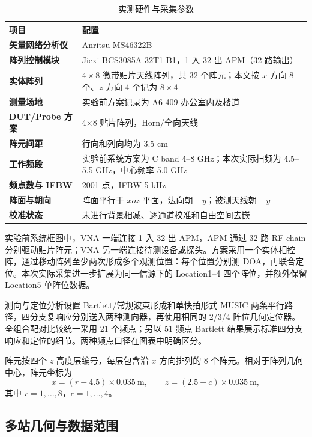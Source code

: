 \documentclass[UTF8,12pt,a4paper]{ctexart}
\begin{document}
\begin{table}[H]
  \centering
  \caption{实测硬件与采集参数}
  \label{tab:hardware}
  \begin{tabularx}{\textwidth}{>{\bfseries}p{}X}
    \toprule
    项目 & 配置 \\
    \midrule
    矢量网络分析仪 & Anritsu MS46322B \\
    阵列控制模块 & Jiexi BCS3085A-32T1-B1，1 入 32 出 APM（32 路输出） \\
    实体阵列 & $4\times8$ 微带贴片天线阵列，共 32 个阵元；本文按 $x$ 方向 8 个、$z$ 方向 4 个记为 $8\times4$ \\
    测量场地 & 实验前方案记录为 A6-409 办公室内及楼道 \\
    DUT/Probe 方案 & 4×8 贴片阵列，Horn/全向天线 \\
    阵元间距 & 行向和列向均为 3.5 cm \\
    工作频段 & 实验前系统方案为 C band 4--8 GHz；本次实际扫频为 4.5--5.5 GHz，中心频率 5.0 GHz \\
    频点数与 IFBW & 2001 点，IFBW 5 kHz \\
    阵面与朝向 & 阵面平行于 $xoz$ 平面，法向朝 $+y$；被测天线朝 $-y$ \\
    校准状态 & 未进行背景相减、逐通道校准和自由空间去嵌 \\
    \bottomrule
  \end{tabularx}
\end{table}

实验前系统框图中，VNA 一端连接 1 入 32 出 APM，APM 通过 32 路 RF chain 分别驱动贴片阵元；VNA 另一端连接待测设备或探头。方案采用一个实体相控阵，通过移动阵列至少两次形成多个观测位置：每个位置分别测 DOA，再联合定位。本次实际采集进一步扩展为同一信源下的 Location1--4 四个阵位，并额外保留 Location5 单阵位数据。

测向与定位分析设置 Bartlett/常规波束形成和单快拍形式 MUSIC 两条平行路径，四分支复响应分别送入两种测向器，再使用相同的 2/3/4 阵位几何定位器。全组合配对比较统一采用 21 个频点；另以 51 频点 Bartlett 结果展示标准四分支响应和定位的细节。两种频点口径在图表中明确区分。

阵元按四个 $z$ 高度层编号，每层包含沿 $x$ 方向排列的 8 个阵元。相对于阵列几何中心，阵元坐标为
\begin{equation}
  x=(r-4.5)\times 0.035\ \mathrm{m},\qquad
  z=(2.5-c)\times 0.035\ \mathrm{m},
\end{equation}
其中 $r=1,\ldots,8$，$c=1,\ldots,4$。

\subsection{多站几何与数据范围}
\end{document}
